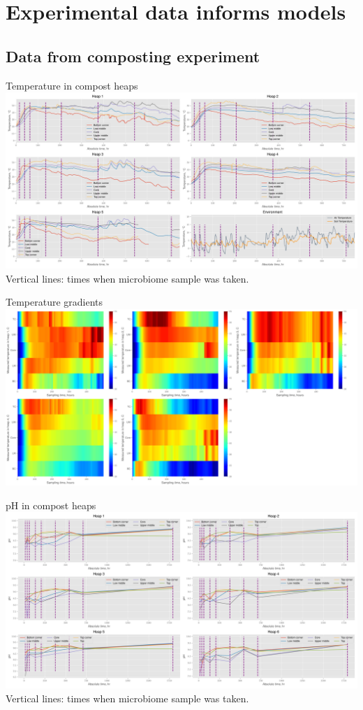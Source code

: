 \documentclass[mathserif,11pt]{beamer}
\begin{document}
\section{Experimental data informs models}
\subsection{Data from composting experiment}
\begin{frame}{Temperature in compost heaps}
\centering
	\includegraphics[width=\textwidth]{Figures/Temperatures_per_heap_crop.png}\\
	Vertical lines: times when microbiome sample was taken.
\end{frame}
\begin{frame}{Temperature gradients}
\centering
	\includegraphics[width=\textwidth]{Figures/all_heaps_temperature.png}\\
\end{frame}
\begin{frame}{pH in compost heaps}
\centering
	\includegraphics[width=\textwidth]{Figures/ph_per_heap.png}\\
	Vertical lines: times when microbiome sample was taken.
\end{frame}
\end{document}

